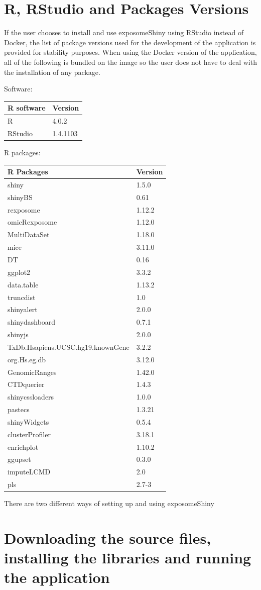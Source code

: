 \documentclass[
]{book}
\begin{document}
\hypertarget{r-rstudio-and-packages-versions}{%
\section{R, RStudio and Packages Versions}\label{r-rstudio-and-packages-versions}}

If the user chooses to install and use exposomeShiny using RStudio instead of Docker, the list of package versions used for the development of the application is provided for stability purposes. When using the Docker version of the application, all of the following is bundled on the image so the user does not have to deal with the installation of any package.

Software:

\begin{longtable}[]{@{}ll@{}}
\toprule
R software & Version\tabularnewline
\midrule
\endhead
R & 4.0.2\tabularnewline
RStudio & 1.4.1103\tabularnewline
\bottomrule
\end{longtable}

R packages:

\begin{longtable}[]{@{}ll@{}}
\toprule
R Packages & Version\tabularnewline
\midrule
\endhead
shiny & 1.5.0\tabularnewline
shinyBS & 0.61\tabularnewline
rexposome & 1.12.2\tabularnewline
omicRexposome & 1.12.0\tabularnewline
MultiDataSet & 1.18.0\tabularnewline
mice & 3.11.0\tabularnewline
DT & 0.16\tabularnewline
ggplot2 & 3.3.2\tabularnewline
data.table & 1.13.2\tabularnewline
truncdist & 1.0\tabularnewline
shinyalert & 2.0.0\tabularnewline
shinydashboard & 0.7.1\tabularnewline
shinyjs & 2.0.0\tabularnewline
TxDb.Hsapiens.UCSC.hg19.knownGene & 3.2.2\tabularnewline
org.Hs.eg.db & 3.12.0\tabularnewline
GenomicRanges & 1.42.0\tabularnewline
CTDquerier & 1.4.3\tabularnewline
shinycssloaders & 1.0.0\tabularnewline
pastecs & 1.3.21\tabularnewline
shinyWidgets & 0.5.4\tabularnewline
clusterProfiler & 3.18.1\tabularnewline
enrichplot & 1.10.2\tabularnewline
ggupset & 0.3.0\tabularnewline
imputeLCMD & 2.0\tabularnewline
pls & 2.7-3\tabularnewline
\bottomrule
\end{longtable}

There are two different ways of setting up and using exposomeShiny

\hypertarget{downloading-the-source-files-installing-the-libraries-and-running-the-application}{%
\section{Downloading the source files, installing the libraries and running the application}\label{downloading-the-source-files-installing-the-libraries-and-running-the-application}}
\end{document}
